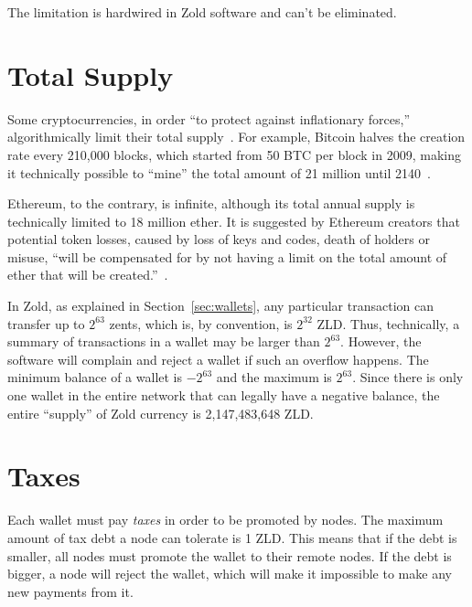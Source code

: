 \documentclass[11pt,oneside]{article}
\begin{document}
The limitation is hardwired in Zold software and can't be eliminated.

\section{Total Supply}\label{sec:supply}

Some cryptocurrencies, in order ``to protect against inflationary forces,''
algorithmically limit their total supply~\parencite{bohr2014}.
For example, Bitcoin halves the creation rate every 210,000 blocks,
which started from 50 BTC per block in 2009,
making it technically possible to ``mine'' the total amount
of 21 million until 2140~\parencite{iwamura2014}.

Ethereum, to the contrary, is infinite, although its total annual
supply is technically limited to 18 million ether. It is suggested
by Ethereum creators that potential token losses, caused by loss of keys and codes, death
of holders or misuse, ``will be compensated for by not having
a limit on the total amount of ether that will be created.''~\parencite{fekkes2018}.

In Zold, as explained in Section~\ref{sec:wallets}, any particular transaction can
transfer up to $2^{63}$ zents, which is, by convention, is $2^{32}$ ZLD.
Thus, technically, a summary of transactions in a wallet may be larger
than $2^{63}$. However, the software will complain and reject a wallet
if such an overflow happens. The minimum balance of a wallet is $-2^{63}$
and the maximum is $2^{63}$. Since there is only one wallet in the entire
network that can legally have a negative balance, the entire ``supply''
of Zold currency is 2,147,483,648 ZLD.

\section{Taxes}\label{sec:taxes}

Each wallet must pay \emph{taxes} in order to be promoted by nodes.
The maximum amount of tax debt a node can tolerate is 1 ZLD. This means
that if the debt is smaller, all nodes must promote the wallet to their
remote nodes. If the debt is bigger, a node will reject the wallet,
which will make it impossible to make any new payments from it.
\end{document}
